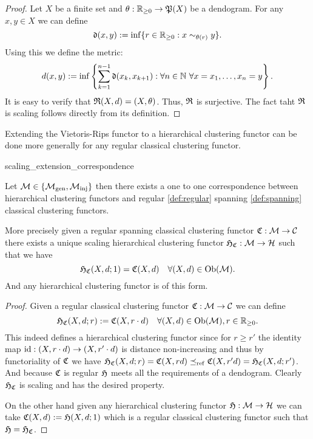 \begin{proof}
Let $X$ be a finite set and $\theta: \mathbb R_{\geq0} \to \mathfrak{P}(X)$ be a dendogram. For any $x,y \in X$ we can define
$$
\mathfrak{d}(x,y) := \inf\{r \in \mathbb R_{\geq0}: x \sim_{\theta(r)} y\}.
$$
Using this we define the metric:
$$
d(x,y) := \inf\left\{\sum_{k=1}^{n-1} \mathfrak{d}(x_k, x_{k+1}): \forall n \in \mathbb N \ \forall x = x_1, \dots, x_n = y\right\}.
$$
It is easy to verify that $\mathfrak{R}(X,d) = (X,\theta)$. Thus, $\mathfrak{R}$ is surjective. The fact taht $\mathfrak{R}$ is scaling follows directly from its definition.
\end{proof}



Extending the Vietoris-Rips functor to a hierarchical clustering functor can be done more generally for any regular classical clustering functor.
\begin{proposition}{}{scaling_extension_correspondence}

Let $\mathcal{M} \in \{{\mathcal{M}_\mathrm{gen}},{\mathcal{M}_\mathrm{inj}}\}$ then there exists a one to one correspondence between
hierarchical clustering functors and regular \ref{def:regular} spanning \ref{def:spanning} classical clustering functors.

\medskip
More precisely given a regular spanning classical clustering functor $\mathfrak{C}: \mathcal{M} \to \mathcal{C}$ there exists a unique scaling hierarchical clustering functor $\mathfrak{H}_{\mathfrak{C}}: \mathcal{M} \to \mathcal{H}$ such that we have
$$
\mathfrak{H}_{\mathfrak{C}}(X,d; 1) = \mathfrak{C}(X,d) \quad \forall (X,d) \in \mathrm {Ob}(\mathcal{M}).
$$
And any hierarchical clustering functor is of this form.
\end{proposition}

\begin{proof}
Given a regular classical clustering functor $\mathfrak{C}: \mathcal{M} \to \mathcal{C}$ we can define
$$
\mathfrak{H}_{\mathfrak{C}}(X,d; r) := \mathfrak{C}(X, r \cdot d) \quad \forall (X,d) \in \mathrm {Ob}(\mathcal{M}), r \in \mathbb R_{\geq0}.
$$
This indeed defines a hierarchical clustering functor since for $r \geq r'$ the identity map $\mathrm{id}: (X, r \cdot d) \to (X, r' \cdot d)$ is distance non-increasing and thus by functoriality of $\mathfrak{C}$ we have $\mathfrak{H}_{\mathfrak{C}}(X,d;r) = \mathfrak{C}(X, r d) \preceq_\mathrm{ref} \mathfrak{C}(X, r' d) = \mathfrak{H}_{\mathfrak{C}}(X,d;r')$. And because $\mathfrak{C}$ is regular $\mathfrak{H}$ meets all the requirements of a dendogram. Clearly $\mathfrak{H}_{\mathfrak{C}}$ is scaling and has the desired property.




On the other hand given any hierarchical clustering functor $\mathfrak{H}: \mathcal{M} \to \mathcal{H}$ we can take $\mathfrak{C}(X,d) := \mathfrak{H}(X,d; 1)$ which is a regular classical clustering functor such that $\mathfrak{H} = \mathfrak{H}_{\mathfrak{C}}$.
\end{proof}

